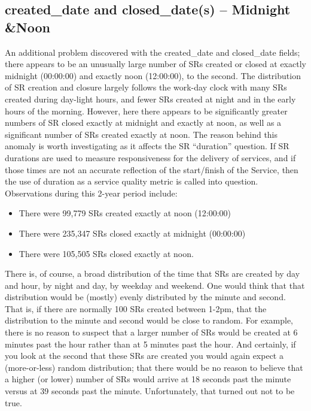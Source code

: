 \documentclass[12pt, titlepage]{article}
\begin{document}
\subsection{created\_date and closed\_date(s) -- Midnight \&Noon}
\label{sec:midnightandnoon}
	An additional problem discovered with the created\_date and 
	closed\_date fields; there appears to be an unusually large number of SRs 
	created or closed at exactly midnight (00:00:00) and exactly noon (12:00:00), 
	to the second. The distribution of SR creation and closure largely follows the 
	work-day clock with many SRs created during day-light hours, and 
	fewer SRs 	created at night and in the early hours of the morning. However, 
	here there appears to be significantly greater numbers of SR closed exactly 
	at midnight and exactly at noon, as well as a significant number of SRs 
	created exactly at noon. The reason behind this anomaly is worth investigating as 
	it affects the SR ``duration'' question. If SR durations are used to measure 
	responsiveness for the delivery of services, and if those times are not an 
	accurate reflection of the start/finish of the Service, then the use of duration 
	as a service quality metric is called into question. Observations during 
	this 2-year period include:
	
	\begin{itemize}
		 \item There were 99,779 SRs created exactly at noon (12:00:00)
		 \item There were 235,347 SRs closed exactly at midnight (00:00:00)
		\item There were 105,505 SRs closed exactly at noon. 
	\end{itemize}
	
	There is, of course, a broad distribution of the time that SRs are 
	created by day and hour, by night and day, by weekday and weekend.  
	One would think that that distribution would be (mostly) evenly distributed 
	by the minute and second. That is, if there are normally 100 SRs created 
	between 1-2pm, that the distribution to the minute and second would be 
	close to random. For example, there is no reason to suspect that a larger 
	number of SRs would be created at 6 minutes past the hour rather 
	than at 5 minutes past the hour. And certainly, if you look at the second 
	that these SRs are created you would again expect a (more-or-less) 
	random distribution; that there would be no reason to believe that a higher 
	(or lower) number of SRs would arrive at 18 seconds past the minute 
	versus at 39 seconds past the minute. Unfortunately, that turned out not to be true.
	
\end{document}
